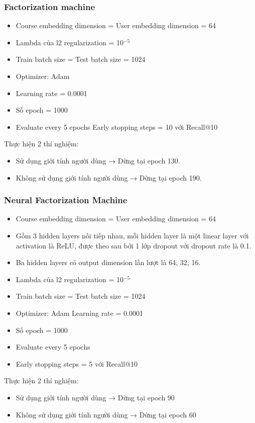 \subsubsection{Factorization machine}
\begin{itemize}
    \item Course embedding dimension = User embedding dimension = 64
    \item Lambda của l2 regularization = 10$^{-5}$
    \item Train batch size = Test batch size = 1024
    \item Optimizer: Adam
    \item Learning rate = 0.0001
    \item Số epoch = 1000
    \item Evaluate every 5 epochs Early stopping steps = 10 với Recall@10
\end{itemize}
Thực hiện 2 thí nghiệm: 
\begin{itemize}
    \item Sử dụng giới tính người dùng → Dừng tại epoch 130.
    \item Không sử dụng giới tính người dùng → Dừng tại epoch 190.
\end{itemize}
\subsubsection{Neural Factorization Machine}
\begin{itemize}
    \item Course embedding dimension = User embedding dimension = 64
    \item Gồm 3 hidden layers nối tiếp nhau, mỗi hidden layer là một linear layer với activation là ReLU, được theo sau bởi 1 lớp dropout với dropout rate là 0.1.
    \item Ba hidden layers có output dimension lần lượt là 64, 32, 16.
    \item Lambda của l2 regularization = 10$^{-5}$
    \item Train batch size = Test batch size = 1024
    \item Optimizer: Adam Learning rate = 0.0001
    \item Số epoch = 1000
    \item Evaluate every 5 epochs
    \item Early stopping steps = 5 với Recall@10
\end{itemize}
Thực hiện 2 thí nghiệm: 
\begin{itemize}
    \item Sử dụng giới tính người dùng → Dừng tại epoch 90
    \item Không sử dụng giới tính người dùng → Dừng tại epoch 60
\end{itemize}

